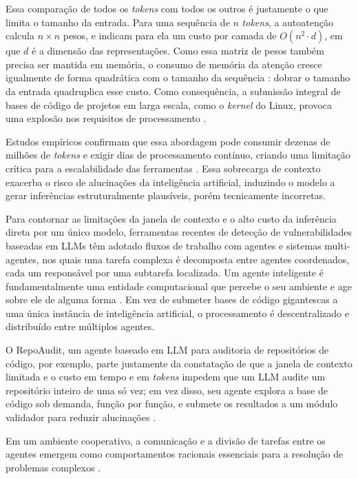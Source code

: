 \documentclass[
    12pt,                %
    openright,           %
    oneside,             %
    a4paper,             %
    english,             %
    brazil               %
]{abntex2}
\begin{document}
\par
Essa comparação de todos os \textit{tokens} com todos os outros é justamente o que limita o tamanho da entrada.
Para uma sequência de $n$ \textit{tokens}, a autoatenção calcula $n \times n$ pesos, e  indicam para ela um custo por camada de $O(n^2 \cdot d)$, em que $d$ é a dimensão das representações.
Como essa matriz de pesos também precisa ser mantida em memória, o consumo de memória da atenção cresce igualmente de forma quadrática com o tamanho da sequência \cite{dao2022flashattention}: dobrar o tamanho da entrada quadruplica esse custo.
Como consequência, a submissão integral de bases de código de projetos em larga escala, como o \textit{kernel} do Linux, provoca uma explosão nos requisitos de processamento \cite{tunstall2022natural}.
\par 
Estudos empíricos confirmam que essa abordagem pode consumir dezenas de milhões de \textit{tokens} e exigir dias de processamento contínuo, criando uma limitação crítica para a escalabilidade das ferramentas \cite{hou2025generation}.
Essa sobrecarga de contexto exacerba o risco de alucinações da inteligência artificial, induzindo o modelo a gerar inferências estruturalmente plausíveis, porém tecnicamente incorretas.
\par
Para contornar as limitações da janela de contexto e o alto custo da inferência direta por um único modelo, ferramentas recentes de detecção de vulnerabilidades baseadas em LLMs têm adotado fluxos de trabalho com agentes e sistemas multi-agentes, nos quais uma tarefa complexa é decomposta entre agentes coordenados, cada um responsável por uma subtarefa localizada.
Um agente inteligente é fundamentalmente uma entidade computacional que percebe o seu ambiente e age sobre ele de alguma forma \cite{russell2020artificial}.
Em vez de submeter bases de código gigantescas a uma única instância de inteligência artificial, o processamento é descentralizado e distribuído entre múltiplos agentes.
\par
O RepoAudit, um agente baseado em LLM para auditoria de repositórios de código, por exemplo, parte justamente da constatação de que a janela de contexto limitada e o custo em tempo e em \textit{tokens} impedem que um LLM audite um repositório inteiro de uma só vez; em vez disso, seu agente explora a base de código sob demanda, função por função, e submete os resultados a um módulo validador para reduzir alucinações \cite{guo2025repoaudit}.
\par
Em um ambiente cooperativo, a comunicação e a divisão de tarefas entre os agentes emergem como comportamentos racionais essenciais para a resolução de problemas complexos \cite{russell2020artificial}.
\end{document}
